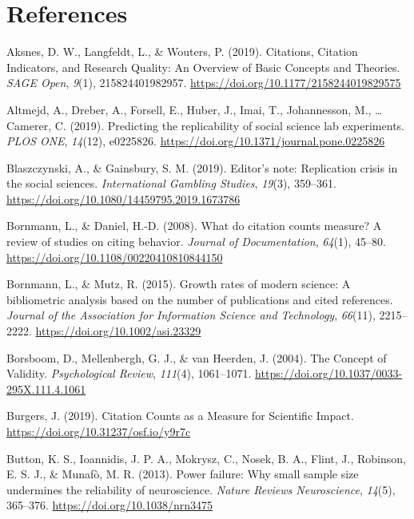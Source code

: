 \documentclass[
  english,
  jou,floatsintext]{apa6}
\newlength{\cslhangindent}
\newenvironment{cslreferences}%
  {\setlength{\parindent}{0pt}%
  \everypar{\setlength{\hangindent}{\cslhangindent}}\ignorespaces}%
  {\par}
\begin{document}
\hypertarget{references}{%
\section*{References}\label{references}}

\hypertarget{refs}{}
\begin{cslreferences}
\leavevmode\hypertarget{ref-Aksnes2019}{}%
Aksnes, D. W., Langfeldt, L., \& Wouters, P. (2019). Citations, Citation Indicators, and Research Quality: An Overview of Basic Concepts and Theories. \emph{SAGE Open}, \emph{9}(1), 215824401982957. \url{https://doi.org/10.1177/2158244019829575}

\leavevmode\hypertarget{ref-Altmejd2019}{}%
Altmejd, A., Dreber, A., Forsell, E., Huber, J., Imai, T., Johannesson, M., \ldots{} Camerer, C. (2019). Predicting the replicability of social science lab experiments. \emph{PLOS ONE}, \emph{14}(12), e0225826. \url{https://doi.org/10.1371/journal.pone.0225826}

\leavevmode\hypertarget{ref-Blaszczynski2019}{}%
Blaszczynski, A., \& Gainsbury, S. M. (2019). Editor's note: Replication crisis in the social sciences. \emph{International Gambling Studies}, \emph{19}(3), 359--361. \url{https://doi.org/10.1080/14459795.2019.1673786}

\leavevmode\hypertarget{ref-Bornmann2008}{}%
Bornmann, L., \& Daniel, H.-D. (2008). What do citation counts measure? A review of studies on citing behavior. \emph{Journal of Documentation}, \emph{64}(1), 45--80. \url{https://doi.org/10.1108/00220410810844150}

\leavevmode\hypertarget{ref-Bornmann2015}{}%
Bornmann, L., \& Mutz, R. (2015). Growth rates of modern science: A bibliometric analysis based on the number of publications and cited references. \emph{Journal of the Association for Information Science and Technology}, \emph{66}(11), 2215--2222. \url{https://doi.org/10.1002/asi.23329}

\leavevmode\hypertarget{ref-Borsboom2004}{}%
Borsboom, D., Mellenbergh, G. J., \& van Heerden, J. (2004). The Concept of Validity. \emph{Psychological Review}, \emph{111}(4), 1061--1071. \url{https://doi.org/10.1037/0033-295X.111.4.1061}

\leavevmode\hypertarget{ref-Burgers2019}{}%
Burgers, J. (2019). Citation Counts as a Measure for Scientific Impact. \url{https://doi.org/10.31237/osf.io/y9r7c}

\leavevmode\hypertarget{ref-Button2013}{}%
Button, K. S., Ioannidis, J. P. A., Mokrysz, C., Nosek, B. A., Flint, J., Robinson, E. S. J., \& Munafò, M. R. (2013). Power failure: Why small sample size undermines the reliability of neuroscience. \emph{Nature Reviews Neuroscience}, \emph{14}(5), 365--376. \url{https://doi.org/10.1038/nrn3475}


\end{cslreferences}
\end{document}
